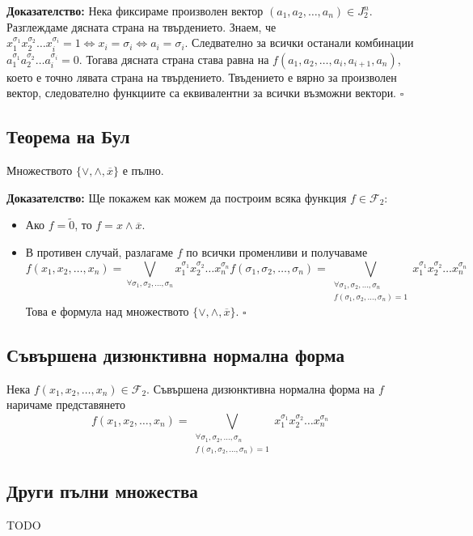 \documentclass[fleqn,12pt]{article}
\begin{document}
\begin{flushleft}
\textbf{Доказателство: } Нека фиксираме произволен вектор $(a_1, a_2, \dots, a_n) \in J_2^n$.
Разглеждаме дясната страна на твърдението. Знаем, че 
$x_1^{\sigma_1} x_2^{\sigma_2} \dots x_i^{\sigma_i} = 1 \Leftrightarrow x_i = \sigma_i \Leftrightarrow a_i = \sigma_i$.
Следвателно за всички останали комбинации $a_1^{\sigma_1} a_2^{\sigma_2} \dots a_i^{\sigma_i} = 0$. Тогава дясната страна става равна на 
$f(a_1, a_2, \dots, a_i, a_{i+1}, a_n)$, което е точно лявата страна на твърдението. Твъдението е вярно за произволен вектор, следователно
функциите са еквивалентни за всички възможни вектори. $\square$

\subsection{Теорема на Бул}
Множеството $\{ \vee, \wedge, \overline{x} \}$ е пълно.

\textbf{Доказателство: } Ще покажем как можем да построим всяка функция $f \in \mathcal{F}_2$:
\begin{itemize}
    \item Ако $f = \widetilde{0}$, то $f = x \wedge \overline{x}$.
    \item В противен случай, разлагаме $f$ по всички променливи и получаваме
    \[ f(x_1, x_2, \dots, x_n) = \bigvee_{\forall \sigma_1, \sigma_2, \dots, \sigma_n} x_1^{\sigma_1} x_2^{\sigma_2} \dots x_n^{\sigma_n} f(\sigma_1, \sigma_2, \dots, \sigma_n) =
    \bigvee_{\substack{\forall \sigma_1, \sigma_2, \dots, \sigma_n \\ f(\sigma_1, \sigma_2, \dots, \sigma_n) = 1}} x_1^{\sigma_1} x_2^{\sigma_2} \dots x_n^{\sigma_n}\]
    Това е формула над множеството $\{ \vee, \wedge, \overline{x} \}$. $\square$
\end{itemize}

\subsection{Съвършена дизюнктивна нормална форма}
Нека $f(x_1, x_2, \dots, x_n) \in \mathcal{F}_2$. Съвършена дизюнктивна нормална форма на $f$ наричаме представянето
\[ f(x_1, x_2, \dots, x_n) = 
    \bigvee_{\substack{\forall \sigma_1, \sigma_2, \dots, \sigma_n \\ f(\sigma_1, \sigma_2, \dots, \sigma_n) = 1}} x_1^{\sigma_1} x_2^{\sigma_2} \dots x_n^{\sigma_n}\]

\subsection{Други пълни множества}
TODO


\end{flushleft}
\end{document}
